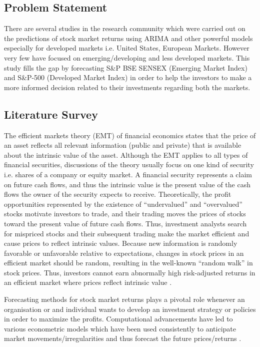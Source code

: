 \documentclass[conference]{IEEEtran}
\begin{document}
\subsection{Problem Statement}
There are several studies in the research community which were carried out on the predictions of stock market returns using ARIMA and other powerful models especially for developed markets i.e. United States, European Markets. However very few have focused on emerging/developing and less developed markets. This study fills the gap by forecasting S\&P BSE SENSEX (Emerging Market Index) and S\&P-500 (Developed Market Index) in order to help the investors to make a more informed decision related to their investments regarding both the markets.
\subsection{Literature Survey}
The efficient markets theory (EMT) of financial economics states that the price of an asset reflects all relevant information (public and private) that is available about the intrinsic value of the asset. Although the EMT applies to all types of financial securities, discussions of the theory usually focus on one kind of security i.e. shares of a company or equity market. A financial security represents a claim on future cash flows, and thus the intrinsic value is the present value of the cash flows the owner of the security expects to receive. Theoretically, the profit opportunities represented by the existence of “undervalued” and “overvalued” stocks motivate investors to trade, and their trading moves the prices of stocks toward the present value of future cash flows. Thus, investment analysts search for mispriced stocks and their subsequent trading make the market efficient and cause prices to reflect intrinsic values. Because new information is randomly favorable or unfavorable relative to expectations, changes in stock prices in an efficient market should be random, resulting in the well-known “random walk” in stock prices. Thus, investors cannot earn abnormally high risk-adjusted returns in an efficient market where prices reflect intrinsic value \cite{b1}.

Forecasting methods for stock market returns plays a pivotal role whenever an organisation or and individual wants to develop an investment strategy or policies in order to maximize the profits. Computational advancements have led to various econometric models which have been used consistently to anticipate market movements/irregularities and thus forecast the future prices/returns \cite{b2}.
\end{document}
